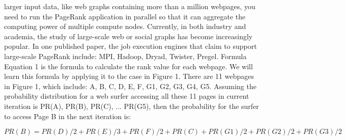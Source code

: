 larger input data, like web graphs containing more than a million webpages, you need to run the PageRank
application in parallel so that it can aggregate the computing power of multiple compute nodes. Currently, in
both industry and academia, the study of large-scale web or social graphs has become increasingly popular.
In one published paper, the job execution engines that claim to support large-scale PageRank include: MPI,
Hadoop, Dryad, Twister, Pregel.
Formula
Equation 1 is the formula to calculate the rank value for each webpage. We will learn this formula by
applying it to the case in Figure 1. There are 11 webpages in Figure 1, which include: A, B, C, D, E, F,
G1, G2, G3, G4, G5. Assuming the probability distribution for a web surfer accessing all these 11 pages in
current iteration is {PR(A), PR(B), PR(C), ... PR(G5)}, then the probability for the surfer to access Page
B in the next iteration is:

\[ PR(B) = P R(D)/2 + P R(E)/3 + P R(F)/2 + P R(C) + P R(G1)/2 + P R(G2)/2 + P R(G3)/2\]


